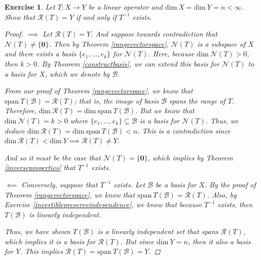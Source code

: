 \documentclass[11pt]{article}
\theoremstyle{mystyle}
\newtheorem{protoexer}{Exercise}[section]
\newenvironment{exer}
{\colorlet{shadecolor}{blue!15}\begin{shaded}\begin{protoexer}}
{\end{protoexer}\end{shaded}}
\newcommand{\0}{\mathbf{0}}
\begin{document}
\begin{exer}\label{inverserange}
Let $T: X \longrightarrow Y$ be a linear operator and $\text{dim} \ X = \text{dim} \ Y = n < \infty$. Show that $\mathscr{R}(T) = Y$ if and only if $T^{-1}$ exists.
\begin{proof}
$\implies$ Let $\mathscr{R}(T) = Y$. And suppose towards contradiction that $\mathscr{N}(T) \neq \{\0\}$. Then by Theorem \ref{rangevectorspace}, $\mathscr{N}(T)$ is a subspace of $X$ and there exists a basis $\{e_1, \ldots, e_k\}$ for $\mathscr{N}(T)$. Here, because $\text{dim} \ \mathscr{N}(T) > 0$, then $k > 0$. By Theorem \ref{constructbasis}, we can extend this basis for $\mathscr{N}(T)$ to a basis for $X$, which we denote by $\mathcal{B}$. 

From our proof of Theorem \ref{rangevectorspace}, we know that $\text{span} \ T(\mathcal{B}) = \mathscr{R}(T)$; that is, the image of basis $\mathcal{B}$ spans the range of $T$. Therefore, $\text{dim} \ \mathscr{R}(T) = \text{dim} \ \text{span} \ T(\mathcal{B})$. But we know that $\text{dim} \ \mathscr{N}(T) = k > 0$ where $\{e_1, \ldots, e_k\} \subseteq \mathcal{B}$ is a basis for $\mathscr{N}(T)$. Thus, we deduce $\text{dim} \ \mathscr{R}(T) = \text{dim} \ \text{span} \ T(\mathcal{B}) < n$. This is a contradiction since $\text{dim} \ \mathscr{R}(T) < \text{dim} \ Y \implies \mathscr{R}(T) \neq Y$.

And so it must be the case that $\mathscr{N}(T) = \{\0\}$, which implies by Theorem \ref{inverseproperties} that $T^{-1}$ exists.

$\impliedby$ Conversely, suppose that $T^{-1}$ exists. Let $\mathcal{B}$ be a basis for $X$. By the proof of Theorem \ref{rangevectorspace}, we know that $\text{span} \  T(\mathcal{B}) = \mathscr{R}(T)$. Also, by Exercise \ref{invertiblepreserveindependence}, we know that because $T^{-1}$ exists, then $T(\mathcal{B})$ is linearly independent. 

Thus, we have shown $T(\mathcal{B})$ is a linearly independent set that spans $\mathscr{R}(T)$, which implies it is a basis for $\mathscr{R}(T)$. But since $\text{dim} \ Y = n$, then it also a basis for $Y$. This implies $\mathscr{R}(T) = \text{span} \ T(\mathcal{B}) = Y$.
\end{proof}
\end{exer}
\end{document}
